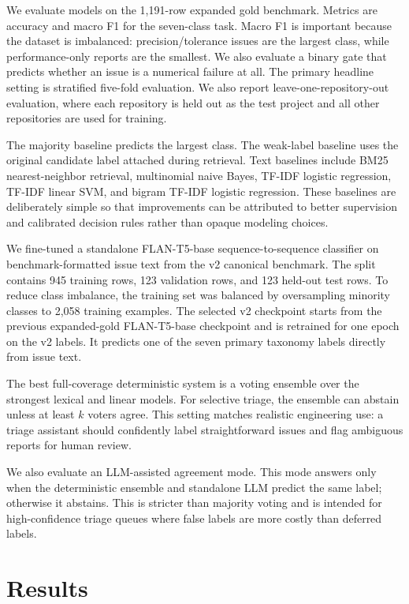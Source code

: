 \documentclass[conference]{IEEEtran}
\begin{document}
We evaluate models on the 1,191-row expanded gold benchmark. Metrics are
accuracy and macro F1 for the seven-class task. Macro F1 is important because
the dataset is imbalanced: precision/tolerance issues are the largest class,
while performance-only reports are the smallest. We also evaluate a binary
gate that predicts whether an issue is a numerical failure at all. The primary
headline setting is stratified five-fold evaluation. We also report
leave-one-repository-out evaluation, where each repository is held out as the
test project and all other repositories are used for training.

The majority baseline predicts the largest class. The weak-label baseline uses
the original candidate label attached during retrieval. Text baselines include
BM25 nearest-neighbor retrieval, multinomial naive Bayes, TF-IDF logistic
regression, TF-IDF linear SVM, and bigram TF-IDF logistic regression. These
baselines are deliberately simple so that improvements can be attributed to
better supervision and calibrated decision rules rather than opaque modeling
choices.

We fine-tuned a standalone FLAN-T5-base sequence-to-sequence classifier on
benchmark-formatted issue text from the v2 canonical benchmark. The split
contains 945 training rows, 123 validation rows, and 123 held-out test rows. To
reduce class imbalance, the training set was balanced by oversampling minority
classes to 2,058 training examples. The selected v2 checkpoint starts from the
previous expanded-gold FLAN-T5-base checkpoint and is retrained for one epoch
on the v2 labels. It predicts one of the seven primary taxonomy labels directly
from issue text.

The best full-coverage deterministic system is a voting ensemble over the
strongest lexical and linear models. For selective triage, the ensemble can
abstain unless at least $k$ voters agree. This setting matches realistic
engineering use: a triage assistant should confidently label straightforward
issues and flag ambiguous reports for human review.

We also evaluate an LLM-assisted agreement mode. This mode answers only when
the deterministic ensemble and standalone LLM predict the same label; otherwise
it abstains. This is stricter than majority voting and is intended for
high-confidence triage queues where false labels are more costly than deferred
labels.

\section{Results}
\end{document}
